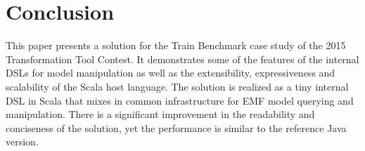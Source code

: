 


\section{Conclusion}
\label{sec:Conclusion}

This paper presents a solution for the Train Benchmark case study of the 2015 Transformation Tool Contest.
It demonstrates some of the features of the \SIGMA internal DSLs for model manipulation as well as the extensibility, expressiveness and scalability of the Scala host language.
The solution is realized as a tiny internal DSL in Scala that mixes in \SIGMA common infrastructure for EMF model querying and manipulation.
There is a significant improvement in the readability and conciseness of the solution, yet the performance is similar to the reference Java version.











